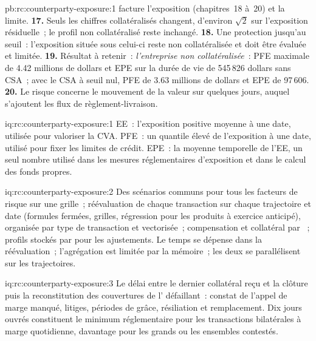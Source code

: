 \begin{solution}{pb:rc:counterparty-exposure:1}
facture l'exposition (chapitres~18 à~20) et la limite.
\textbf{17.} Seuls les chiffres collatéralisés changent, d'environ $\sqrt2$ sur l'exposition résiduelle~;
le profil non collatéralisé reste inchangé.
\textbf{18.} Une protection jusqu'au seuil~: l'exposition située sous celui-ci reste non collatéralisée et
doit être évaluée et limitée.
\textbf{19.} Résultat à retenir~: \emph{l'entreprise non collatéralisée}~: PFE maximale de 4.42 millions de dollars et
EPE sur la durée de vie de 545\,826 dollars sans CSA~; avec le CSA à seuil nul, PFE de 3.63 millions de dollars et EPE de 97\,606.
\textbf{20.} Le risque concerne le mouvement de la valeur sur quelques jours, auquel s'ajoutent les flux de règlement-livraison.
\end{solution}

\begin{solution}{iq:rc:counterparty-exposure:1}
EE~: l'exposition positive moyenne à une date, utilisée pour valoriser la CVA. PFE~: un quantile élevé de
l'exposition à une date, utilisé pour fixer les limites de crédit. EPE~: la moyenne temporelle de l'EE, un seul nombre
utilisé dans les mesures réglementaires d'exposition et dans le calcul des fonds propres.
\end{solution}

\begin{solution}{iq:rc:counterparty-exposure:2}
Des scénarios communs pour tous les facteurs de risque sur une grille~; réévaluation de chaque transaction sur chaque trajectoire
et date (formules fermées, grilles, régression pour les produits à exercice anticipé), organisée par type de transaction et
vectorisée~; compensation et collatéral par ~; profils stockés par  pour
les ajustements. Le temps se dépense dans la réévaluation~; l'agrégation est limitée par la mémoire~; les deux
se parallélisent sur les trajectoires.
\end{solution}

\begin{solution}{iq:rc:counterparty-exposure:3}
Le délai entre le dernier collatéral reçu et la clôture puis la reconstitution des couvertures de l' défaillant~: constat de l'appel de marge manqué, litiges, périodes de grâce, résiliation et
remplacement. Dix jours ouvrés constituent le minimum réglementaire pour les transactions bilatérales
à marge quotidienne, davantage pour les grands  ou les ensembles contestés.
\end{solution}

